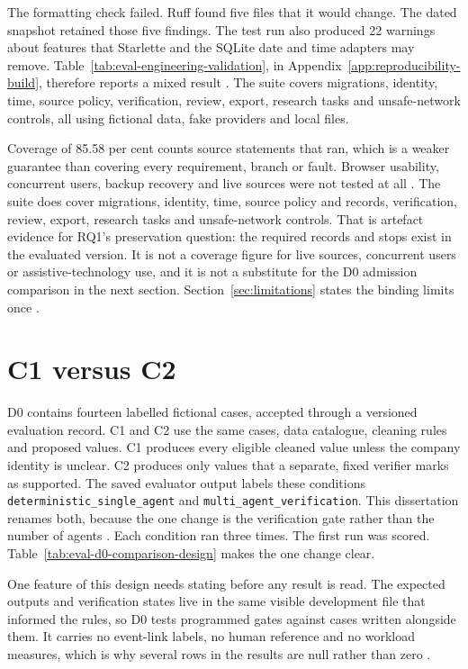 The formatting check failed. Ruff found five files that it would change. The dated snapshot retained
those five findings. The test run also produced 22 warnings about features that Starlette and the
SQLite date and time adapters may remove. Table~\ref{tab:eval-engineering-validation}, in
Appendix~\ref{app:reproducibility-build}, therefore reports a mixed result
\citep{gebru2021datasheets,pineau2021reproducibility}. The suite covers migrations, identity, time,
source policy, verification, review, export, research tasks and unsafe-network controls, all using
fictional data, fake providers and local files.

Coverage of 85.58 per cent counts source statements that ran, which is a weaker guarantee than
covering every requirement, branch or fault. Browser usability, concurrent users, backup recovery and
live sources were not tested at all \citep{hevner2004design,peffers2007dsrm,nist2023airmf}. The suite
does cover migrations, identity, time, source policy and records, verification, review, export,
research tasks and unsafe-network controls. That is artefact evidence for RQ1's preservation
question: the required records and stops exist in the evaluated version. It is not a coverage
figure for live sources, concurrent users or assistive-technology use, and it is not a substitute
for the D0 admission comparison in the next section.
Section~\ref{sec:limitations} states the binding limits once
\citep{hevner2004design,pineau2021reproducibility}.

\section{C1 versus C2}

D0 contains fourteen labelled fictional cases, accepted through a versioned evaluation record. C1 and
C2 use the same cases, data catalogue, cleaning rules and proposed values. C1 produces every eligible
cleaned value unless the company identity is unclear. C2 produces only values that a separate, fixed
verifier marks as supported. The saved evaluator output labels these conditions
\texttt{deterministic\_single\_agent} and \texttt{multi\_agent\_verification}. This dissertation
renames both, because the one change is the verification gate rather than the number of agents
\citep{guo2024multiagent,wu2024autogen,fu2026agents}. Each condition ran three times. The first run
was scored. Table~\ref{tab:eval-d0-comparison-design} makes the one change clear.

One feature of this design needs stating before any result is read. The expected outputs and
verification states live in the same visible development file that informed the rules, so D0 tests
programmed gates against cases written alongside them. It carries no event-link labels, no human
reference and no workload measures, which is why several rows in the results are null rather than
zero \citep{kapoor2023leakage,pineau2021reproducibility,peffers2007dsrm}.

